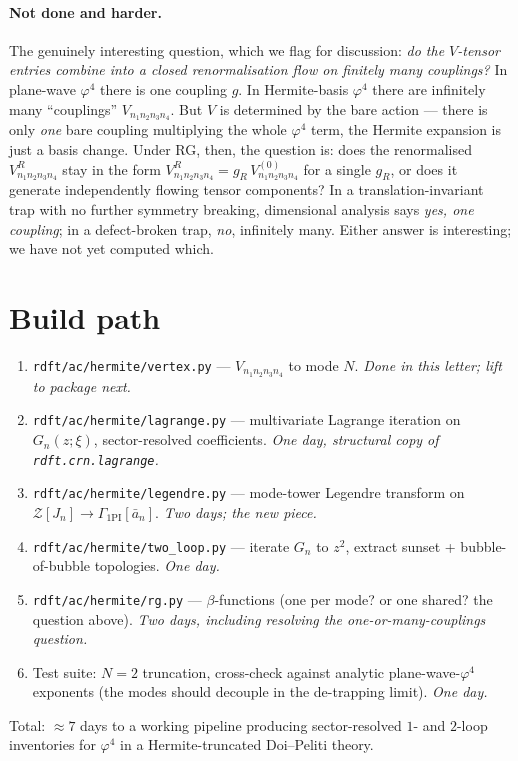 \documentclass[11pt,a4paper]{article}
\begin{document}
\paragraph{Not done and harder.} The genuinely interesting question, which we flag for
discussion: \emph{do the $V$-tensor entries combine into a closed renormalisation flow on
finitely many couplings?} In plane-wave $\varphi^{4}$ there is one coupling $g$. In
Hermite-basis $\varphi^{4}$ there are infinitely many ``couplings'' $V_{n_{1}n_{2}n_{3}n_{4}}$.
But $V$ is determined by the bare action --- there is only \emph{one} bare coupling
multiplying the whole $\varphi^{4}$ term, the Hermite expansion is just a basis change.
Under RG, then, the question is: does the renormalised $V_{n_{1}n_{2}n_{3}n_{4}}^{R}$ stay
in the form $V_{n_{1}n_{2}n_{3}n_{4}}^{R} = g_{R}\,V_{n_{1}n_{2}n_{3}n_{4}}^{(0)}$ for a
single $g_{R}$, or does it generate independently flowing tensor components? In a
translation-invariant trap with no further symmetry breaking, dimensional analysis says
\emph{yes, one coupling}; in a defect-broken trap, \emph{no}, infinitely many. Either
answer is interesting; we have not yet computed which.

\section{Build path}

\begin{enumerate}[leftmargin=2em,itemsep=2pt,topsep=2pt]
\item \texttt{rdft/ac/hermite/vertex.py} --- $V_{n_{1}n_{2}n_{3}n_{4}}$ to mode $N$.
\emph{Done in this letter; lift to package next.}
\item \texttt{rdft/ac/hermite/lagrange.py} --- multivariate Lagrange iteration on
$G_{n}(z;\xi)$, sector-resolved coefficients. \emph{One day, structural copy of
\texttt{rdft.crn.lagrange}.}
\item \texttt{rdft/ac/hermite/legendre.py} --- mode-tower Legendre transform on
$\mathcal Z[J_{n}]\to\Gamma_{\text{1PI}}[\bar a_{n}]$. \emph{Two days; the new piece.}
\item \texttt{rdft/ac/hermite/two\_loop.py} --- iterate $G_{n}$ to $z^{2}$, extract sunset
+ bubble-of-bubble topologies. \emph{One day.}
\item \texttt{rdft/ac/hermite/rg.py} --- $\beta$-functions (one per mode? or one shared?
the question above). \emph{Two days, including resolving the one-or-many-couplings
question.}
\item Test suite: $N{=}2$ truncation, cross-check against analytic
plane-wave-$\varphi^{4}$ exponents (the modes should decouple in the de-trapping limit).
\emph{One day.}
\end{enumerate}
Total: $\approx 7$ days to a working pipeline producing sector-resolved $1$- and $2$-loop
inventories for $\varphi^{4}$ in a Hermite-truncated Doi--Peliti theory.
\end{document}

